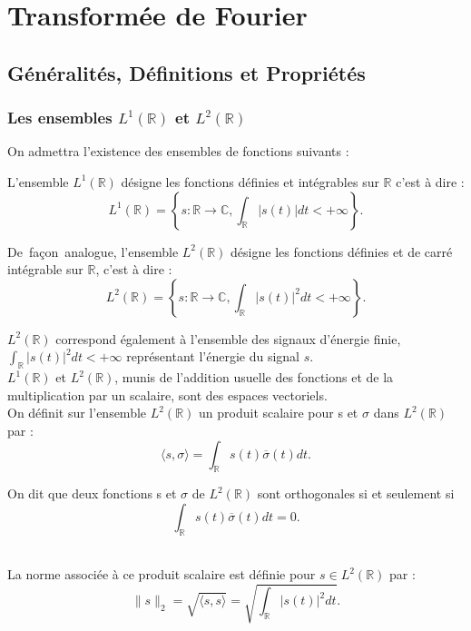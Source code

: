 \chapter{Transformée de Fourier}

\section{Généralités, Définitions et Propriétés}

\subsection{Les ensembles $L^1(\mathbb{R})$ et $L^2(\mathbb{R})$\label{L2}}
On admettra l'existence des ensembles de fonctions suivants :
\begin{definition}
L'ensemble $L^1(\mathbb{R})$ désigne les fonctions définies et intégrables sur $\mathbb{R}$ c'est à dire : 
$$L^1(\mathbb{R})=\left\{s:\mathbb{R}\rightarrow\mathbb{C},\int_\mathbb{R}|s(t)|dt<+\infty\right\}.$$

De\ fa\c{c}on\ analogue, l'ensemble $L^2(\mathbb{R})$ désigne les fonctions définies et de carré intégrable sur $\mathbb{R}$, c'est à dire : 
$$L^2(\mathbb{R})=\left\{s:\mathbb{R}\rightarrow\mathbb{C},\int_\mathbb{R}|s(t)|^2dt<+\infty\right\}.$$ 
\end{definition}

$L^2(\mathbb{R})$ correspond également à l'ensemble des signaux d'énergie finie, $\int_\mathbb{R}|s(t)|^2dt<+\infty$ représentant l'énergie du signal $s$.\\

$L^1(\mathbb{R})$ et $L^2(\mathbb{R})$, munis de l'addition usuelle des fonctions et de la multiplication par un scalaire, sont des espaces vectoriels.\\

On définit sur l'ensemble $L^2(\mathbb{R})$ un produit scalaire pour s et $\sigma$ dans $L^2(\mathbb{R})$ par :\
$$\langle s,\sigma\rangle=\int_\mathbb{R}s(t)\overline{\sigma}(t)dt.$$

\begin{definition}\label{pp}
On dit que deux fonctions s et $\sigma$ de $L^2(\mathbb{R})$ sont orthogonales
si et seulement si $$\int_\mathbb{R}s(t)\overline{\sigma}(t)dt=0.$$ \
\end{definition}

La norme associée à ce produit scalaire est définie pour
$s\in L^2(\mathbb{R})$ par :
$$\|s\|_2=\sqrt{\langle s,s\rangle}=\sqrt{\int_\mathbb{R}|s(t)|^2 dt}. $$
\\

